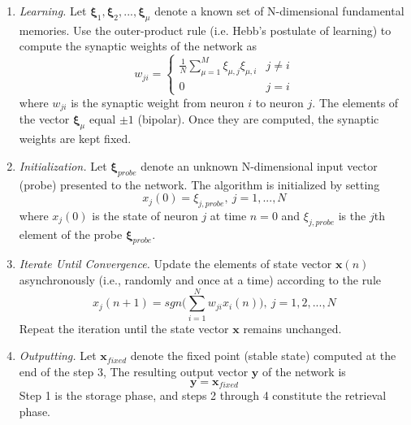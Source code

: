 \begin{enumerate}
	\item \textit{Learning.} Let \( \boldsymbol{\xi}_1, \boldsymbol{\xi}_2, ..., \boldsymbol{\xi}_{\mu} \) denote a known set of N-dimensional fundamental memories. Use the outer-product rule (i.e. Hebb's postulate of learning) to compute the synaptic weights of the network as 
	\begin{equation}
		w_{ji} =
			\begin{cases}
				\frac{1}{N} \sum_{\mu=1}^{M}\xi_{\mu,j}\xi_{\mu,i}	& j \neq i \\
				0																										& j = i 
			\end{cases}
	\end{equation}
	where \(w_{ji}\) is the synaptic weight from neuron \(i\) to neuron \(j\). The elements of the vector \( \boldsymbol{\xi}_\mu \) equal \(\pm 1\) (bipolar). Once they are computed, the synaptic weights are kept fixed.
	
	\item \textit{Initialization.} Let \( \boldsymbol{\xi}_{probe} \) denote an unknown N-dimensional input vector (probe) presented to the network. The algorithm is initialized by setting
	\begin{equation}
		x_j(0) = \xi_{j,probe}, \> j = 1,...,N
	\end{equation}
	where \( x_j(0) \) is the state of neuron \(j\) at time \(n = 0\) and \( \xi_{j,probe} \) is the \(j\)th element of the probe \( \boldsymbol{\xi}_{probe} \).
	
	\item \textit{Iterate Until Convergence.} Update the elements of state vector \( \boldsymbol{x}(n) \) asynchronously (i.e., randomly and once at a time) according to the rule
	\begin{equation}
		x_j(n+1)=sgn \Bigg(\sum_{i=1}^{N} w_{ji}x_i(n) \Bigg), \> j = 1,2, ..., N
	\end{equation}
	Repeat the iteration until the state vector \( \boldsymbol{x} \) remains unchanged.
	
	\item \textit{Outputting.} Let \( \boldsymbol{x}_{fixed} \) denote the fixed point (stable state) computed at the end of the step 3, The resulting output vector \( \boldsymbol{y} \) of the network is
	\begin{equation}
		\boldsymbol{y} = \boldsymbol{x}_{fixed}
	\label{eq:}
	\end{equation}
	Step 1 is the storage phase, and steps 2 through 4 constitute the retrieval phase.
\end{enumerate}

